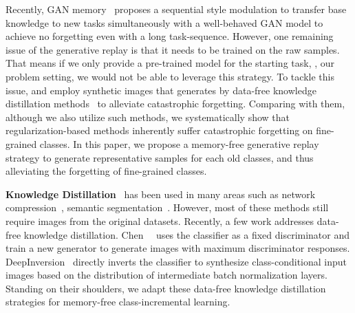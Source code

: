 \documentclass[10pt,twocolumn,letterpaper]{article}
\begin{document}
Recently, GAN memory~\cite{Cong2020} proposes a sequential style modulation to transfer base knowledge to new tasks simultaneously with a well-behaved GAN model to achieve no forgetting even with a long task-sequence.  
However, one remaining issue of the generative replay is that it needs to be trained on the raw samples. That means if we only provide a pre-trained model for the starting task, \ie, our problem setting, we would not be able to leverage this strategy. To tackle this issue, \cite{smith2021always} and \cite{choi2021dual} employ synthetic images that generates by data-free knowledge distillation methods~\cite{chen2019data, yin2020dreaming} to alleviate catastrophic forgetting. Comparing with them, although we also utilize such methods, we systematically show that regularization-based methods inherently suffer catastrophic forgetting on fine-grained classes. In this paper, we propose a memory-free generative replay strategy to generate representative samples for each old classes, and thus alleviating the forgetting of fine-grained classes.

\textbf{Knowledge Distillation}~\cite{hinton2015distilling} has been used in many areas such as network compression~\cite{li2020few}, semantic segmentation~\cite{liu2019structured}. However, most of these methods still require images from the original datasets. Recently, a  few work addresses data-free knowledge distillation. Chen~\etal~\cite{chen2019data} uses the classifier as a fixed discriminator and train a new generator to generate images with maximum discriminator responses. DeepInversion~\cite{yin2020dreaming} directly inverts the classifier to synthesize class-conditional input images based on the distribution of intermediate batch normalization layers. Standing on their shoulders, we adapt these data-free knowledge distillation strategies for memory-free class-incremental learning. 
\end{document}
